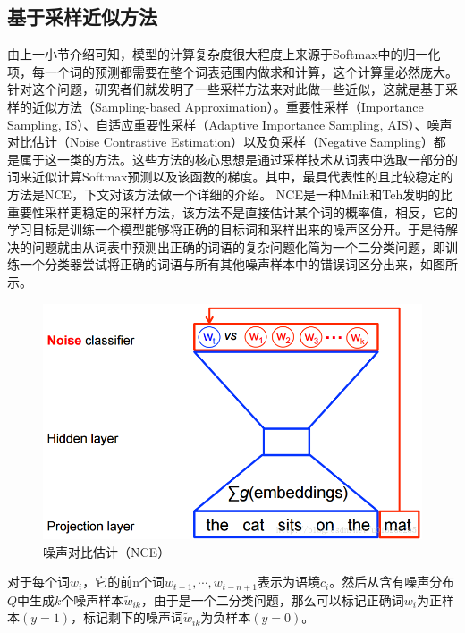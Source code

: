 \documentclass[12pt,a4paper]{article}
\begin{document}
\subsection{基于采样近似方法}
由上一小节介绍可知，模型的计算复杂度很大程度上来源于Softmax中的归一化项，每一个词的预测都需要在整个词表范围内做求和计算，这个计算量必然庞大。针对这个问题，研究者们就发明了一些采样方法来对此做一些近似，这就是基于采样的近似方法（Sampling-based Approximation）。重要性采样（Importance Sampling, IS）\cite{DBLP:conf/aistats/BengioS03}、自适应重要性采样（Adaptive Importance Sampling, AIS）\cite{DBLP:journals/tnn/BengioS08}、噪声对比估计（Noise Contrastive Estimation）\cite{DBLP:journals/jmlr/GutmannH12,DBLP:conf/icml/MnihT12}以及负采样（Negative Sampling）\cite{DBLP:journals/corr/abs-1301-3781}都是属于这一类的方法。这些方法的核心思想是通过采样技术从词表中选取一部分的词来近似计算Softmax预测以及该函数的梯度。其中，最具代表性的且比较稳定的方法是NCE，下文对该方法做一个详细的介绍。
NCE是一种Mnih和Teh发明的比重要性采样更稳定的采样方法，该方法不是直接估计某个词的概率值，相反，它的学习目标是训练一个模型能够将正确的目标词和采样出来的噪声区分开。于是待解决的问题就由从词表中预测出正确的词语的复杂问题化简为一个二分类问题，即训练一个分类器尝试将正确的词语与所有其他噪声样本中的错误词区分出来，如图所示。
\begin{figure}
  \centering
  \includegraphics[width=0.6\linewidth]{./figures/nce.png}
  \caption{噪声对比估计（NCE）}\label{fig:nce}
\end{figure}

对于每个词${w_i}$，它的前n个词${w_{t-1},\cdots,w_{t-n+1}}$表示为语境${c_i}$。然后从含有噪声分布$Q$中生成$k$个噪声样本${\tilde{w}_{ik}}$，由于是一个二分类问题，那么可以标记正确词$w_i$为正样本${(y=1)}$，标记剩下的噪声词${\tilde{w}_{ik}}$为负样本${(y=0)}$。
\end{document}
